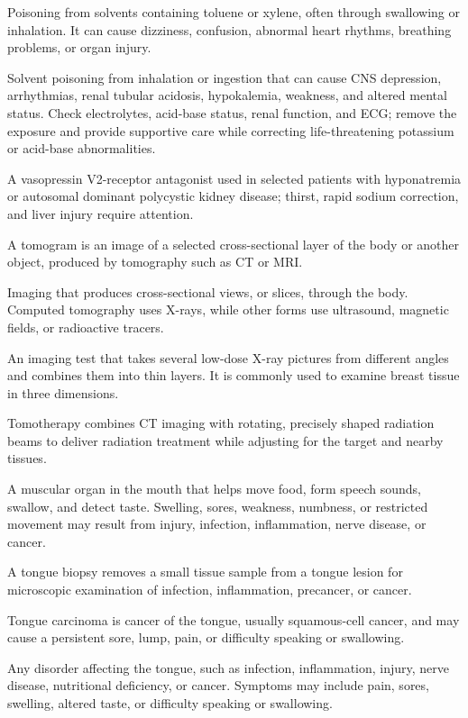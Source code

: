  Poisoning from solvents containing toluene or xylene, often through swallowing or inhalation. It can cause dizziness, confusion, abnormal heart rhythms, breathing problems, or organ injury.

 Solvent poisoning from inhalation or ingestion that can cause CNS depression, arrhythmias, renal tubular acidosis, hypokalemia, weakness, and altered mental status. Check electrolytes, acid-base status, renal function, and ECG; remove the exposure and provide supportive care while correcting life-threatening potassium or acid-base abnormalities.

 A vasopressin V2-receptor antagonist used in selected patients with hyponatremia or autosomal dominant polycystic kidney disease; thirst, rapid sodium correction, and liver injury require attention.

 A tomogram is an image of a selected cross-sectional layer of the body or another object, produced by tomography such as CT or MRI.

 Imaging that produces cross-sectional views, or slices, through the body. Computed tomography uses X-rays, while other forms use ultrasound, magnetic fields, or radioactive tracers.

 An imaging test that takes several low-dose X-ray pictures from different angles and combines them into thin layers. It is commonly used to examine breast tissue in three dimensions.

 Tomotherapy combines CT imaging with rotating, precisely shaped radiation beams to deliver radiation treatment while adjusting for the target and nearby tissues.

 A muscular organ in the mouth that helps move food, form speech sounds, swallow, and detect taste. Swelling, sores, weakness, numbness, or restricted movement may result from injury, infection, inflammation, nerve disease, or cancer.

 A tongue biopsy removes a small tissue sample from a tongue lesion for microscopic examination of infection, inflammation, precancer, or cancer.

 Tongue carcinoma is cancer of the tongue, usually squamous-cell cancer, and may cause a persistent sore, lump, pain, or difficulty speaking or swallowing.

 Any disorder affecting the tongue, such as infection, inflammation, injury, nerve disease, nutritional deficiency, or cancer. Symptoms may include pain, sores, swelling, altered taste, or difficulty speaking or swallowing.

